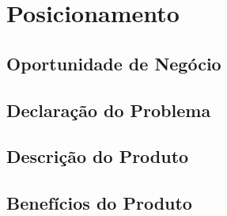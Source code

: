 \chapter{Posicionamento}

\section{Oportunidade de Negócio}

\section{Declaração do Problema}

\section{Descrição do Produto}

\section{Benefícios do Produto}